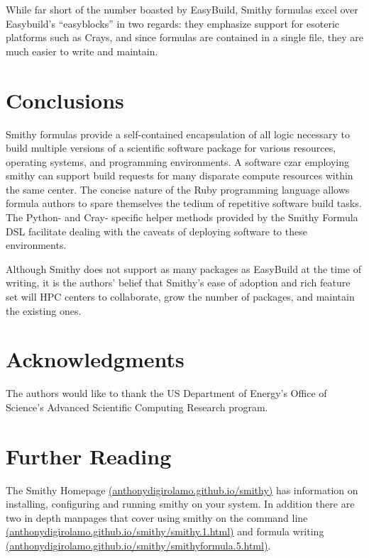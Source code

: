 \documentclass{acm_proc_article-sp}
\begin{document}
While far short of the number boasted by EasyBuild, Smithy formulas excel over
Easybuild's ``easyblocks'' in two regards: they emphasize support for esoteric
platforms such as Crays, and since formulas are contained in a single file, they
are much easier to write and maintain.

\section{Conclusions}

Smithy formulas provide a self-contained encapsulation of all logic necessary to
build multiple versions of a scientific software package for various resources,
operating systems, and programming environments. A software czar employing
smithy can support build requests for many disparate compute resources within
the same center. The concise nature of the Ruby programming language allows
formula authors to spare themselves the tedium of repetitive software build
tasks. The Python- and Cray- specific helper methods provided by the Smithy
Formula DSL facilitate dealing with the caveats of deploying software to these
environments.

Although Smithy does not support as many packages as EasyBuild at the time of
writing, it is the authors' belief that Smithy's ease of adoption and rich
feature set will HPC centers to collaborate, grow the number of packages, and
maintain the existing ones.

\section{Acknowledgments}

The authors would like to thank the US Department of Energy's Office of
Science's Advanced Scientific Computing Research program.

\section{Further Reading}

The Smithy Homepage
\href{http://anthonydigirolamo.github.io/smithy/}{(anthonydigirolamo.github.io/smithy)}
has information on installing, configuring and running smithy on your system. In
addition there are two in depth manpages that cover using smithy on the command
line
\href{http://anthonydigirolamo.github.io/smithy/smithy.1.html}{(anthonydigirolamo.github.io/smithy/smithy.1.html)}
and formula writing
\href{http://anthonydigirolamo.github.io/smithy/smithyformula.5.html}{(anthonydigirolamo.github.io/smithy/smithyformula.5.html)}.
\end{document}
